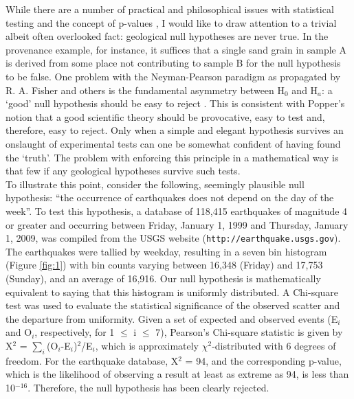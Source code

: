 \documentclass{article}
\begin{document}
While there are a number of practical and philosophical issues with
statistical testing and the concept of p-values \citep{ziliak2008}, I
would like to draw attention to a trivial albeit often overlooked
fact: geological null hypotheses are never true. In the provenance
example, for instance, it suffices that a single sand grain in sample
A is derived from some place not contributing to sample B for the null
hypothesis to be false. One problem with the Neyman-Pearson paradigm
as propagated by R. A. Fisher and others is the fundamental asymmetry
between H$_0$ and H$_a$: a `good' null hypothesis should be easy to
reject \citep{rice1995}. This is consistent with Popper's notion that
a good scientific theory should be provocative, easy to test and,
therefore, easy to reject. Only when a simple and elegant hypothesis
survives an onslaught of experimental tests can one be somewhat
confident of having found the `truth'. The problem with enforcing this
principle in a mathematical way is that few if any geological
hypotheses survive such tests.
\\

To illustrate this point, consider the following, seemingly plausible
null hypothesis: ``the occurrence of earthquakes does not depend on
the day of the week''. To test this hypothesis, a database of 118,415
earthquakes of magnitude 4 or greater and occurring between Friday,
January 1, 1999 and Thursday, January 1, 2009, was compiled from the
USGS website ({\tt http://earth\-quake.usgs.gov}).  The earthquakes
were tallied by weekday, resulting in a seven bin histogram (Figure
\ref{fig:1}) with bin counts varying between 16,348 (Friday) and
17,753 (Sunday), and an average of 16,916. Our null hypothesis is
mathematically equivalent to saying that this histogram is uniformly
distributed. A Chi-square test was used to evaluate the statistical
significance of the observed scatter and the departure from
uniformity. Given a set of expected and observed events (E$_i$ and
O$_i$, respectively, for 1 $\leq$ i $\leq$ 7), Pearson's Chi-square
statistic is given by X$^2$ = $\sum_i$(O$_i$-E$_i$)$^2$/E$_i$, which
is approximately $\chi^2$-distributed with 6 degrees of freedom. For
the earthquake database, X$^2$ = 94, and the corresponding p-value,
which is the likelihood of observing a result at least as extreme as
94, is less than 10$^{-16}$. Therefore, the null hypothesis has been
clearly rejected.
\\
\end{document}
